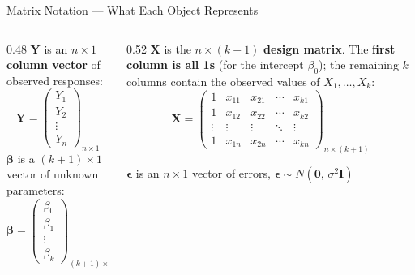 \documentclass[12pt, aspectratio=169]{beamer}
\begin{document}
    \begin{frame}{Matrix Notation --- What Each Object Represents}
        \begin{columns}
            \begin{column}{0.48\textwidth}
                $\mathbf{Y}$ is an $n \times 1$ \textbf{column vector} of observed
                responses:
                \vspace{-0.5em}
                \[
                    \mathbf{Y} =
                    \begin{pmatrix} Y_1 \\ Y_2 \\ \vdots \\ Y_n \end{pmatrix}_{n \times 1}
                \]
                $\boldsymbol{\beta}$ is a $(k+1) \times 1$ vector of unknown parameters:
                \vspace{-0.5em}
                \[
                    \boldsymbol{\beta} =
                    \begin{pmatrix} \beta_0 \\ \beta_1 \\ \vdots \\ \beta_k \end{pmatrix}_{(k+1)\times 1}
                \]
            \end{column}
            \begin{column}{0.52\textwidth}
                $\mathbf{X}$ is the $n \times (k+1)$ \textbf{design matrix}. The \textbf{first column is all 1s} (for the intercept $\beta_0$); the remaining $k$ columns contain the observed values of
                $X_1, \ldots, X_k$:
                \[
                    \mathbf{X} =
                    \begin{pmatrix}
                        1 & x_{11} & x_{21} & \cdots & x_{k1} \\
                        1 & x_{12} & x_{22} & \cdots & x_{k2} \\
                        \vdots & \vdots & \vdots & \ddots & \vdots \\
                        1 & x_{1n} & x_{2n} & \cdots & x_{kn}
                    \end{pmatrix}_{n\times(k+1)}
                \]

                $\boldsymbol{\epsilon}$ is an $n \times 1$ vector of errors,
                $\boldsymbol{\epsilon} \sim N(\mathbf{0},\,\sigma^2 \mathbf{I})$
            \end{column}
        \end{columns}
    \end{frame}
\end{document}
